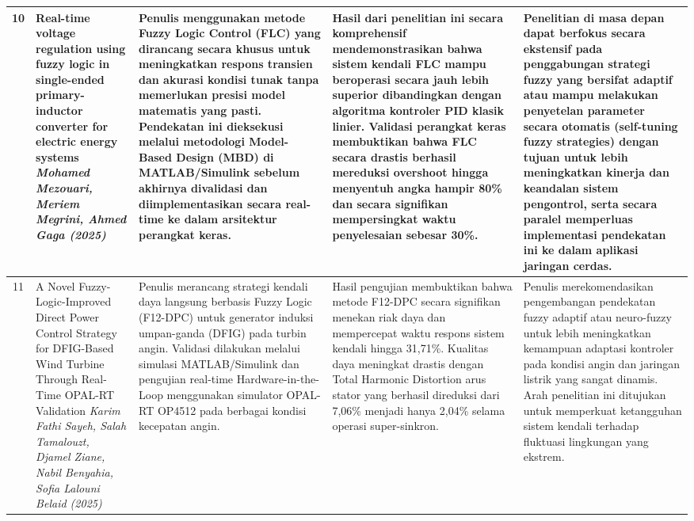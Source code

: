\documentclass[11pt,a4paper]{article}
\begin{document}
\begin{small}
\begin{longtable}{|c|>{\raggedright\arraybackslash}p{3.2cm}|>{\raggedright\arraybackslash}p{4cm}|>{\raggedright\arraybackslash}p{4cm}|>{\raggedright\arraybackslash}p{4cm}|}
10 & Real-time voltage regulation using fuzzy logic in single-ended primary-inductor converter for electric energy systems \newline \newline \textit{Mohamed Mezouari, Meriem Megrini, Ahmed Gaga (2025)} & Penulis menggunakan metode Fuzzy Logic Control (FLC) yang dirancang secara khusus untuk meningkatkan respons transien dan akurasi kondisi tunak tanpa memerlukan presisi model matematis yang pasti. Pendekatan ini dieksekusi melalui metodologi Model-Based Design (MBD) di MATLAB/Simulink sebelum akhirnya divalidasi dan diimplementasikan secara real-time ke dalam arsitektur perangkat keras. & Hasil dari penelitian ini secara komprehensif mendemonstrasikan bahwa sistem kendali FLC mampu beroperasi secara jauh lebih superior dibandingkan dengan algoritma kontroler PID klasik linier. Validasi perangkat keras membuktikan bahwa FLC secara drastis berhasil mereduksi overshoot hingga menyentuh angka hampir 80\% dan secara signifikan mempersingkat waktu penyelesaian sebesar 30\%. & Penelitian di masa depan dapat berfokus secara ekstensif pada penggabungan strategi fuzzy yang bersifat adaptif atau mampu melakukan penyetelan parameter secara otomatis (self-tuning fuzzy strategies) dengan tujuan untuk lebih meningkatkan kinerja dan keandalan sistem pengontrol, serta secara paralel memperluas implementasi pendekatan ini ke dalam aplikasi jaringan cerdas. \\
\hline

11 & A Novel Fuzzy-Logic-Improved Direct Power Control Strategy for DFIG-Based Wind Turbine Through Real-Time OPAL-RT Validation \newline \newline \textit{Karim Fathi Sayeh, Salah Tamalouzt, Djamel Ziane, Nabil Benyahia, Sofia Lalouni Belaid (2025)} & Penulis merancang strategi kendali daya langsung berbasis Fuzzy Logic (F12-DPC) untuk generator induksi umpan-ganda (DFIG) pada turbin angin. Validasi dilakukan melalui simulasi MATLAB/Simulink dan pengujian real-time Hardware-in-the-Loop menggunakan simulator OPAL-RT OP4512 pada berbagai kondisi kecepatan angin. & Hasil pengujian membuktikan bahwa metode F12-DPC secara signifikan menekan riak daya dan mempercepat waktu respons sistem kendali hingga 31,71\%. Kualitas daya meningkat drastis dengan Total Harmonic Distortion arus stator yang berhasil direduksi dari 7,06\% menjadi hanya 2,04\% selama operasi super-sinkron. & Penulis merekomendasikan pengembangan pendekatan fuzzy adaptif atau neuro-fuzzy untuk lebih meningkatkan kemampuan adaptasi kontroler pada kondisi angin dan jaringan listrik yang sangat dinamis. Arah penelitian ini ditujukan untuk memperkuat ketangguhan sistem kendali terhadap fluktuasi lingkungan yang ekstrem. \\
\hline


\end{longtable}
\end{small}
\end{document}
